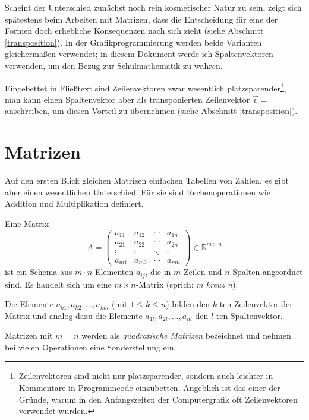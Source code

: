 Scheint der Unterschied zunächst noch rein kosmetischer Natur zu sein, zeigt sich spätestens beim Arbeiten mit Matrizen, dass die Entscheidung für eine der Formen doch erhebliche Konsequenzen nach sich zieht (siehe Abschnitt \ref{transposition}). In der Grafikprogrammierung werden beide Varianten gleichermaßen verwendet; in diesem Dokument werde ich Spaltenvektoren verwenden, um den Bezug zur Schulmathematik zu wahren.

Eingebettet in Fließtext sind Zeilenvektoren zwar wesentlich platzsparender\footnote{Zeilenvektoren sind nicht nur platzsparender, sondern auch leichter in Kommentare in 
Programmcode einzubetten. Angeblich ist das einer der Gründe, warum in den Anfangszeiten der Computergrafik oft Zeilenvektoren verwendet wurden.
}, man kann einen Spaltenvektor aber als transponierten Zeilenvektor $\vec{v} = $  anschreiben, um diesen Vorteil zu übernehmen (siehe Abschnitt \ref{transposition}).


\section{Matrizen}
Auf den ersten Blick gleichen Matrizen einfachen Tabellen von Zahlen, es gibt aber einen wesentlichen Unterschied: Für sie sind Rechenoperationen wie Addition und Multiplikation definiert.

Eine Matrix
\begin{equation}
 A = \begin{pmatrix}
   a_{11} & a_{12} & \cdots & a_{1n}\\
   a_{21} & a_{22} & \cdots & a_{2n}\\
   \vdots & \vdots & \ddots & \vdots\\
   a_{m1} & a_{m2} & \cdots & a_{mn}
 \end{pmatrix}
 \in \mathbb{R}^{m \times n}
\end{equation}
ist ein Schema aus $m \cdot n$ Elementen $a_{ij}$, die in $m$ Zeilen und $n$ Spalten angeordnet sind. Es handelt sich um eine $m \times n$-Matrix (sprich: \emph{m kreuz n}).

Die Elemente $a_{k1}, a_{k2}, \ldots, a_{km}$ (mit $1 \leq k \leq n$) bilden den $k$-ten Zeilenvektor der Matrix und analog dazu die Elemente $a_{1l}, a_{2l}, \ldots, a_{nl}$ den $l$-ten Spaltenvektor. 

Matrizen mit $m = n$ werden als \emph{quadratische Matrizen} bezeichnet und nehmen bei vielen Operationen eine Sonderstellung ein.


